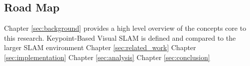 \subsection{Road Map}

Chapter \ref{sec:background} provides a high level overview of the concepts core to this research. Keypoint-Based Visual SLAM is defined and compared to the larger SLAM environment
Chapter \ref{sec:related_work}
Chapter \ref{sec:implementation}
Chapter \ref{sec:analysis}
Chapter \ref{sec:conclusion}